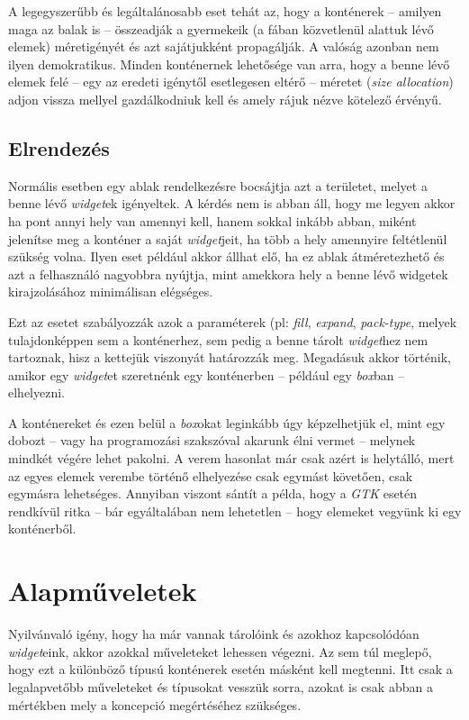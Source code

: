 \documentclass[a4paper,10pt]{article}
\begin{document}
A legegyszerűbb és legáltalánosabb eset tehát az, hogy a konténerek -- amilyen maga az balak is -- összeadják a gyermekeik (a fában közvetlenül alattuk lévő elemek) méretigényét és azt sajátjukként propagálják. A valóság azonban nem ilyen demokratikus. Minden konténernek lehetősége van arra, hogy a benne lévő elemek felé -- egy az eredeti igénytől esetlegesen eltérő -- méretet (\textit{size allocation}) adjon vissza mellyel gazdálkodniuk kell és amely rájuk nézve kötelező érvényű.

\subsection{Elrendezés}

Normális esetben egy ablak rendelkezésre bocsájtja azt a területet, melyet a benne lévő \textit{widget}ek igényeltek. A kérdés nem is abban  áll, hogy me legyen akkor ha pont annyi hely van amennyi kell, hanem sokkal inkább abban, miként jelenítse meg a konténer a saját \textit{widget}jeit, ha több a hely amennyire feltétlenül szükség volna. Ilyen eset például akkor állhat elő, ha ez ablak átméretezhető és azt a felhasználó nagyobbra nyújtja, mint amekkora hely a benne lévő widgetek kirajzolásához minimálisan elégséges.

Ezt az esetet szabályozzák azok a paraméterek (pl: \textit{fill}, \textit{expand}, \textit{pack-type}, melyek tulajdonképpen sem a konténerhez, sem pedig a benne tárolt \textit{widget}hez nem tartoznak, hisz a kettejük viszonyát határozzák meg. Megadásuk akkor történik, amikor egy \textit{widget}et szeretnénk egy konténerben -- például egy \textit{box}ban -- elhelyezni.

A konténereket és ezen belül a \textit{box}okat leginkább úgy képzelhetjük el, mint egy dobozt -- vagy ha programozási szakszóval akarunk élni vermet -- melynek mindkét végére lehet pakolni. A verem hasonlat már csak azért is helytálló, mert az egyes elemek verembe történő elhelyezése csak egymást követően, csak egymásra lehetséges. Annyiban viszont sántít a példa, hogy a \textit{GTK} esetén rendkívül ritka -- bár egyáltalában nem lehetetlen -- hogy elemeket vegyünk ki egy konténerből.

\section{Alapműveletek}

Nyilvánvaló igény, hogy ha már vannak tárolóink és azokhoz kapcsolódóan \textit{widget}eink, akkor azokkal műveleteket lehessen végezni. Az sem túl meglepő, hogy ezt a különböző típusú konténerek esetén másként kell megtenni. Itt csak a legalapvetőbb műveleteket és típusokat vesszük sorra, azokat is csak abban a mértékben mely a koncepció megértéséhez szükséges.
\end{document}
